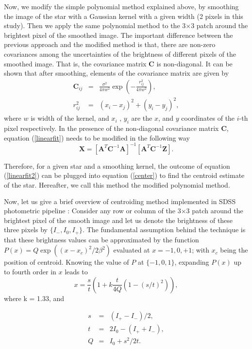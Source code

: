 \documentclass[12pt, preprint]{aastex}
\newcommand{\beq}{\begin{equation}}
\newcommand{\eeq}{\end{equation}}
\begin{document}
Now, we modify the simple polynomial method explained above, by smoothing the image of the star with a Gaussian kernel with a given width (2 pixels in this study). Then we apply the same polynomial method to the 3$\times$3 patch around the brightest pixel of the smoothed image. The important difference between the previous approach and the modified method is that, there are non-zero covariances among the uncertainties of the brightness of different pixels of the smoothed image. That is, the covariance matrix $\mathbf{C}$ is non-diagonal. It can be shown that after smoothing, elements of the covariance matrix are given by
\begin{eqnarray}
\mathbf{C}_{ij} &=& \frac{\sigma^{2}}{4\pi w^{2}} \exp(-\frac{r_{ij}^{2}}{4\pi w^{2}}),\\
r_{ij}^{2} &=& (x_{i} - x_{j})^{2} + (y_{i} - y_{j})^{2},
\label{nondiagonal}
\end{eqnarray}
where $w$ is width of the kernel, and $x_{i}$ , $y_{i}$ are the $x$, and $y$ coordinates of the $i$-th pixel respectively. In the presence of the non-diagonal covariance matrix $\mathbf{C}$, equation (\ref{linearfit}) needs to be modified in the following way
\beq
\mathbf{X} = [\mathbf{A}^{T}\mathbf{C}^{-1}\mathbf{A}]^{-1}[\mathbf{A}^{T}\mathbf{C}^{-1}\mathbf{Z}].
\label{linearfit2}
\eeq

Therefore, for a given star and a smoothing kernel, the outcome of equation (\ref{linearfit2}) can be plugged into equation (\ref{center}) to find the centroid estimate of the star. Hereafter, we call this method the modified polynomial method.
 
Now, let us give a brief overview of centroiding method implemented in SDSS photometric pipeline \citep{sdss}: Consider any row or column of the 3$\times$3 patch around the brightest pixel of the smooth image and let us denote the brightness of these three pixels by $\{I_{-},I_{0},I_{+}\}$. The fundamental assumption behind the technique is that these brightness values can be approximated by the function $P(x) = Q\exp((x-x_{c})^{2}/2\beta^{2})$ evaluated at $x=-1,0,+1$; with $x_{c}$ being the position of centroid. Knowing the value of $P$ at $\{-1,0,1\}$, expanding $P(x)$ up to fourth order in $x$ leads to
\beq
x = \frac{s}{t}(1+k\frac{t}{4Q}(1-(s/t)^{2})),
\eeq
where k = 1.33, and

\begin{eqnarray}
s&=&(I_{+}-I_{-})/2, \\
t &=&2I_{0} - (I_{+}+I_{-}), \\
Q &=& I_{0} +s^{2}/2t.
\label{def}
\end{eqnarray}
\end{document}
